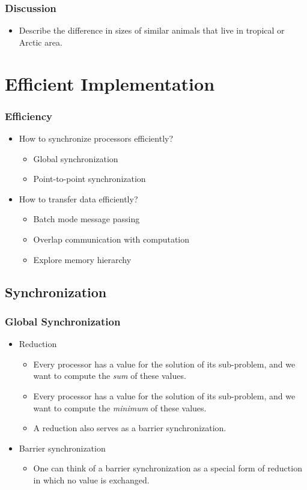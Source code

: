 \documentclass{beamer}
\begin{document}
\begin{CJK}{UTF8}{bsmi}
\begin{frame}
\frametitle{Discussion}
\begin{itemize}
\item Describe the difference in sizes of similar animals that live in tropical or Arctic area.
\end{itemize}
\end{frame}

\section{Efficient Implementation}

\begin{frame}
\frametitle{Efficiency}
\begin{itemize}
\item How to synchronize processors efficiently?
\begin{itemize}
\item Global synchronization
\item Point-to-point synchronization
\end{itemize}
\item How to transfer data efficiently?
\begin{itemize}
\item Batch mode message passing
\item Overlap communication with computation
\item Explore memory hierarchy
\end{itemize}
\end{itemize}
\end{frame}

\subsection{Synchronization}

\begin{frame}
\frametitle{Global Synchronization}
\begin{itemize}
\item Reduction
\begin{itemize}
\item Every processor has a value for the solution of its sub-problem,
  and we want to compute the {\em sum} of these values.
\item Every processor has a value for the solution of its sub-problem,
  and we want to compute the {\em minimum} of these values.
\item A reduction also serves as a barrier synchronization.
\end{itemize}
\item Barrier synchronization
\begin{itemize}
\item One can think of a barrier synchronization as a special form of
  reduction in which no value is exchanged.
\end{itemize}
\end{itemize}
\end{frame}


\end{CJK}
\end{document}
